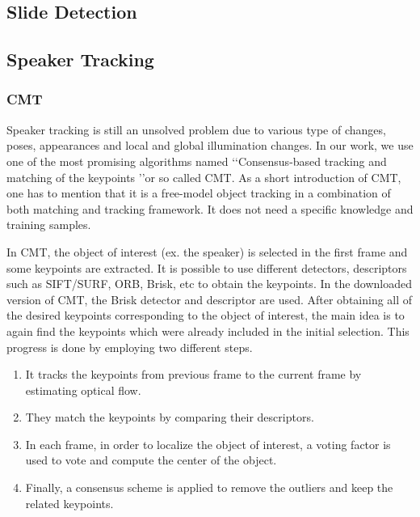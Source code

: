 \documentclass[[12pt,DIV14,BCOR12mm,a4paper,footexclude,headinclude,halfparskip-,twoside,openright,cleardoubleempty,idxtotoc,bibtotoc]{article}
\begin{document}
\subsection{Slide Detection}

\subsection{Speaker Tracking}


\subsubsection{CMT}
Speaker tracking is still an unsolved problem due to various type of changes, poses, appearances and local and global illumination changes. In our work, we use one of the most promising algorithms named \lq\lq Consensus-based tracking and matching of the keypoints \rq\rq or so called CMT. As a short introduction of CMT, one has to mention that it is a free-model object tracking in a combination of both matching and tracking framework. It does not need a specific knowledge  and training samples. 

In CMT, the object of interest (ex. the speaker) is selected in the first frame and some keypoints are extracted. It is possible to use different detectors, descriptors such as SIFT/SURF, ORB, Brisk, etc to obtain the keypoints. In the downloaded version of CMT, the Brisk detector and descriptor are used. After obtaining all of the desired keypoints corresponding to the object of interest, the main idea is to again find the keypoints which were already included in the initial selection. This progress is done by employing two different steps.

\begin{enumerate}

\item It tracks the keypoints from previous frame to the current frame by estimating optical flow.
\item They match the keypoints by comparing their descriptors.
\item In each frame, in order to localize the object of interest, a voting factor is used to vote and compute the center of the object.
\item Finally, a consensus scheme is applied to remove the outliers and keep the related keypoints.
\end{enumerate}
\end{document}
